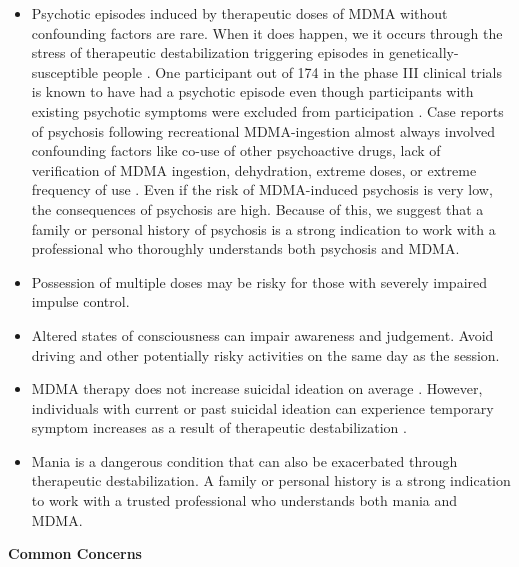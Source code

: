 \documentclass[12pt,letterpaper]{article}
\begin{document}
\begin{itemize}
    \item Psychotic episodes induced by therapeutic doses of MDMA without confounding factors are rare. When it does happen, we it occurs through the stress of therapeutic destabilization triggering episodes in genetically-susceptible people \cite{winkelPsychosisStress}. One participant out of 174 in the phase III clinical trials is known to have had a psychotic episode even though participants with existing psychotic symptoms were excluded from participation \cite{studyingHarms,smithSystematic,mitchellMDMAClinicalTrial2}. Case reports of psychosis following recreational MDMA-ingestion almost always involved confounding factors like co-use of other psychoactive drugs, lack of verification of MDMA ingestion, dehydration, extreme doses, or extreme frequency of use \cite{mcguirePsychosis,patelPsychosis,vaivaPsychosis}. Even if the risk of MDMA-induced psychosis is very low, the consequences of psychosis are high. Because of this, we suggest that a family or personal history of psychosis is a strong indication to work with a professional who thoroughly understands both psychosis and MDMA.
    \item Possession of multiple doses may be risky for those with severely impaired impulse control.
    \item Altered states of consciousness can impair awareness and judgement. Avoid driving and other potentially risky activities on the same day as the session.
    \item MDMA therapy does not increase suicidal ideation on average \cite{mitchellMDMAClinicalTrial,mitchellMDMAClinicalTrial2}. However, individuals with current or past suicidal ideation can experience temporary symptom increases as a result of therapeutic destabilization \cite{studyingHarms}.  
    \item Mania is a dangerous condition that can also be exacerbated through therapeutic destabilization. A family or personal history is a strong indication to work with a trusted professional who understands both mania and MDMA. 
\end{itemize}
\noindent \textbf{Common Concerns}
\end{document}
